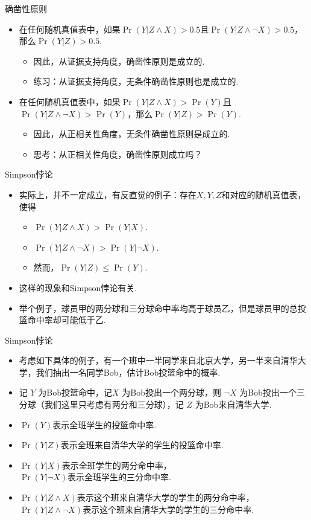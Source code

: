 {确凿性原则}
\begin{itemize}
    \item 在任何随机真值表中，如果$\Pr(Y|Z\wedge X)>0.5$且$\Pr(Y|Z\wedge\neg X)>0.5$，那么$\Pr(Y|Z)>0.5$.
    \begin{itemize}
        \item 因此，从证据支持角度，确凿性原则是成立的.
        \item 练习：从证据支持角度，无条件确凿性原则也是成立的.
    \end{itemize}
    \item 在任何随机真值表中，如果$\Pr(Y|Z\wedge X)>\Pr(Y)$且$\Pr(Y|Z\wedge\neg X)>\Pr(Y)$，那么$\Pr(Y|Z)>\Pr(Y)$.
    \begin{itemize}
        \item 因此，从正相关性角度，无条件确凿性原则是成立的.
        \item 思考：从正相关性角度，确凿性原则成立吗？
    \end{itemize}

\end{itemize}

{Simpson悖论}
\begin{itemize}
    \item 实际上，并不一定成立，有反直觉的例子：存在$X, Y, Z$和对应的随机真值表，使得
    \begin{itemize}
        \item $\Pr(Y| Z\wedge X)>\Pr(Y|X)$.
        \item $\Pr(Y| Z \wedge \neg X)>\Pr(Y|\neg X)$.
        \item 然而，$\Pr(Y|Z)\le \Pr(Y)$.
    \end{itemize}
    \item 这样的现象和Simpson悖论有关. \item 举个例子，球员甲的两分球和三分球命中率均高于球员乙，但是球员甲的总投篮命中率却可能低于乙.
\end{itemize}


{Simpson悖论}
    \begin{itemize}
        \item 考虑如下具体的例子，有一个班中一半同学来自北京大学，另一半来自清华大学，我们抽出一名同学Bob，估计Bob投篮命中的概率.
        \item 记 $Y$ 为Bob投篮命中，记$X$ 为Bob投出一个两分球，则 $\neg X$ 为Bob投出一个三分球（我们这里只考虑有两分和三分球），记 $Z$ 为Bob来自清华大学.
        \item $\Pr(Y)$表示全班学生的投篮命中率.
        \item $\Pr(Y|Z)$表示全班来自清华大学的学生的投篮命中率.
        \item $\Pr(Y|X)$表示全班学生的两分命中率，\\$\Pr(Y|\neg X)$表示全班学生的三分命中率.
        \item $\Pr(Y|Z \wedge X)$表示这个班来自清华大学的学生的两分命中率，$\Pr(Y|Z \wedge \neg X)$表示这个班来自清华大学的学生的三分命中率.
    \end{itemize}  


